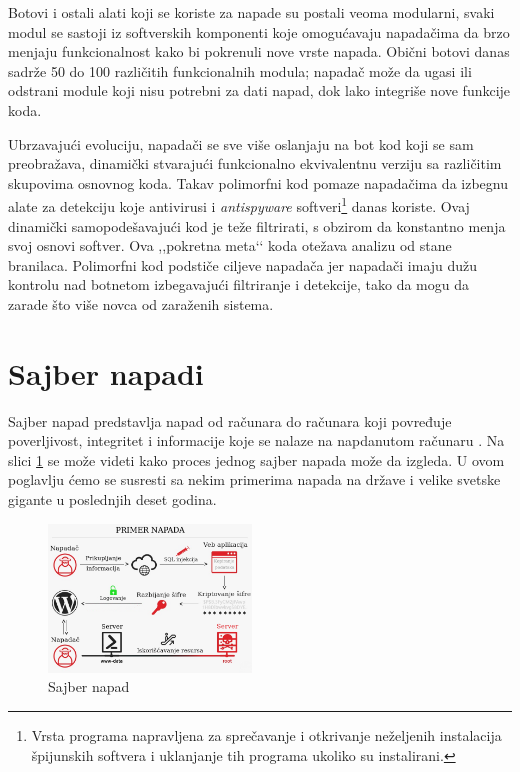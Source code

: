 \documentclass[a4paper]{article}
\theoremstyle{break}
\begin{document}
{Botovi i ostali alati koji se koriste za napade su postali veoma modularni, svaki modul se sastoji iz softverskih komponenti koje omogućavaju napadačima da brzo menjaju funkcionalnost kako bi pokrenuli nove vrste napada. Obični botovi danas sadrže 50 do 100 različitih funkcionalnih modula; napadač može da ugasi ili odstrani module koji nisu potrebni za dati napad, dok lako integriše nove funkcije koda. 

Ubrzavajući evoluciju, napadači se sve više oslanjaju na bot kod koji se sam preobražava, dinamički stvarajući funkcionalno ekvivalentnu verziju sa različitim skupovima osnovnog koda. Takav polimorfni kod pomaze napadačima da izbegnu alate za detekciju koje antivirusi i \textit{antispyware} softveri\footnote{Vrsta programa napravljena za sprečavanje i otkrivanje neželjenih instalacija špijunskih softvera i uklanjanje tih programa ukoliko su instalirani.} danas koriste. Ovaj dinamički samopodešavajući kod je teže filtrirati, s obzirom da konstantno menja svoj osnovi softver. Ova ,,pokretna meta‘‘ koda otežava analizu od stane branilaca. Polimorfni kod podstiče ciljeve napadača jer napadači imaju dužu kontrolu nad botnetom izbegavajući filtriranje i detekcije, tako da mogu da zarade što više novca od zaraženih sistema.

\section{Sajber napadi}
\label{sec:sajber_napadi}

Sajber napad predstavlja napad od računara do računara koji povređuje poverljivost, integritet i informacije koje se nalaze na napdanutom računaru \cite{knjiga}. Na slici \ref{fig:primer_napada} se može videti kako proces jednog sajber napada može da izgleda. U ovom poglavlju ćemo se susresti sa nekim primerima napada na države i velike svetske gigante u poslednjih deset godina.

\clearpage

\begin{figure}[h!]
\begin{center}
\includegraphics[width=0.48\textwidth]{napad.png}
\end{center}
\caption{Sajber napad}
\label{fig:primer_napada}
\end{figure}

}
\end{document}
